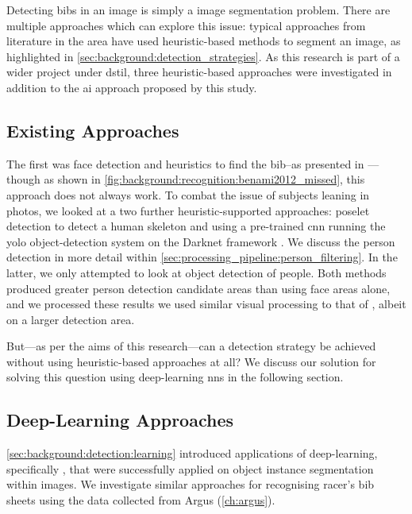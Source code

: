 Detecting bibs in an image is simply a image segmentation problem. There are multiple approaches which can explore this issue: typical approaches from literature in the area have used heuristic-based methods to segment an image, as highlighted in \cref{sec:background:detection_strategies}. As this research is part of a wider project under \gls{dstil}, three heuristic-based approaches were investigated in addition to the  \gls{ai} approach proposed by this study. 

\subsection{Existing Approaches}
\label{sec:processing_pipeline:bib_detection:existing_approaches}

The first was face detection and heuristics to find the bib--as presented in \citep{Benami:2012jf}---though as shown in \cref{fig:background:recognition:benami2012_missed}, this approach does not always work. To combat the issue of subjects leaning in photos, we looked at a two further heuristic-supported approaches: poselet detection to detect a human skeleton \citep{Nguyen:2015vc} and using a pre-trained \gls{cnn} running the \gls{yolo} object-detection system \citep{redmon2016yolo9000} on the Darknet framework \citep{darknet13}. We discuss the person detection in more detail within \cref{sec:processing_pipeline:person_filtering}. In the latter, we only attempted to look at object detection of people. Both methods produced greater person detection candidate areas than using face areas alone, and we processed  these results we used similar visual processing to that of \citet{Benami:2012jf}, albeit on a larger detection area.

But---as per the aims of this research---can a detection strategy be achieved without using heuristic-based approaches at all? We discuss our solution for solving this question using deep-learning \glspl{nn} in the following section.

\subsection{Deep-Learning Approaches}
\label{sec:processing_pipeline:bib_detection:deep_learning}

\def \frcnn {Faster-\gls{rcnn}}

\cref{sec:background:detection:learning} introduced applications of deep-learning, specifically , that were successfully applied on object instance segmentation within images. We investigate similar approaches for recognising racer's bib sheets using the data collected from Argus  (\cref{ch:argus}).

